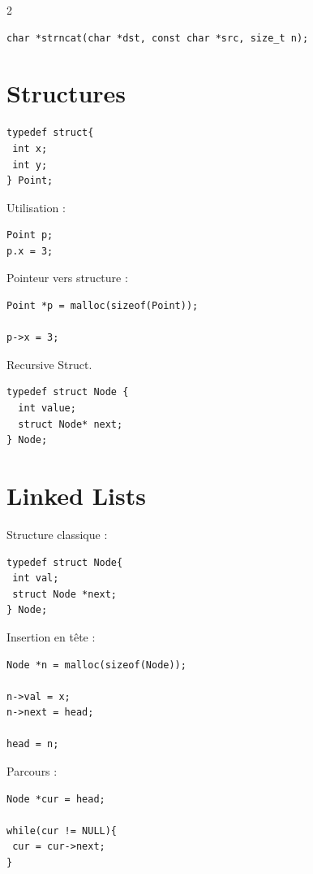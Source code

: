 \documentclass[8pt]{article}
\begin{document}
\begin{multicols}{2}
\begin{lstlisting}
char *strncat(char *dst, const char *src, size_t n);
\end{lstlisting}

\section{Structures}

\begin{lstlisting}
typedef struct{
 int x;
 int y;
} Point;
\end{lstlisting}

Utilisation :

\begin{lstlisting}
Point p;
p.x = 3;
\end{lstlisting}

Pointeur vers structure :

\begin{lstlisting}
Point *p = malloc(sizeof(Point));

p->x = 3;
\end{lstlisting}

Recursive Struct.
\begin{lstlisting}
typedef struct Node {
  int value;
  struct Node* next;
} Node;
\end{lstlisting}
\section{Linked Lists}

Structure classique :

\begin{lstlisting}
typedef struct Node{
 int val;
 struct Node *next;
} Node;
\end{lstlisting}

Insertion en tête :

\begin{lstlisting}
Node *n = malloc(sizeof(Node));

n->val = x;
n->next = head;

head = n;
\end{lstlisting}

Parcours :

\begin{lstlisting}
Node *cur = head;

while(cur != NULL){
 cur = cur->next;
}
\end{lstlisting}


\end{multicols}
\end{document}
